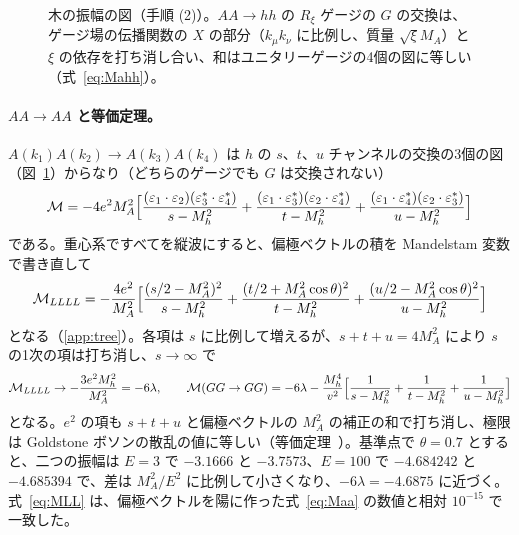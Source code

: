 \documentclass[a4paper,10pt]{ltjsarticle}
\newcommand{\tchan}[5]{%
  \draw[#1] (-1.0,0.72) -- (0,0.4); \draw[#2] (0,0.4) -- (1.0,0.72);
  \draw[#3] (0,0.4) -- (0,-0.4);
  \draw[#4] (-1.0,-0.72) -- (0,-0.4); \draw[#5] (0,-0.4) -- (1.0,-0.72);
  \node[vtx] at (0,0.4) {}; \node[vtx] at (0,-0.4) {};}
\newcommand{\uchan}[5]{%
  \draw[#1] (-1.0,0.72) -- (0,0.4); \draw[#2] (0,0.4) -- (1.0,-0.72);
  \draw[#3] (0,0.4) -- (0,-0.4);
  \draw[#4] (-1.0,-0.72) -- (0,-0.4); \draw[#5] (0,-0.4) -- (1.0,0.72);
  \node[vtx] at (0,0.4) {}; \node[vtx] at (0,-0.4) {};}
\begin{document}
\begin{figure}[tbp]
\caption{木の振幅の図（手順 (2)）。$AA\to hh$ の $R_\xi$ ゲージの $G$ の交換は、ゲージ場の伝播関数の $X$ の部分（$k_\mu k_\nu$ に比例し、質量 $\sqrt\xi M_A$）と $\xi$ の依存を打ち消し合い、和はユニタリーゲージの4個の図に等しい（式~\eqref{eq:Mahh}）。}
\label{fig:treediag}
\end{figure}

\paragraph{$AA\to AA$ と等価定理。}$A(k_1)A(k_2)\to A(k_3)A(k_4)$ は $h$ の $s$、$t$、$u$ チャンネルの交換の3個の図（図~\ref{fig:treediag}）からなり（どちらのゲージでも $G$ は交換されない）
\begin{equation}
\mathcal M=-4e^2M_A^2\Bigl[\frac{(\varepsilon_1\cdot\varepsilon_2)(\varepsilon_3^*\cdot\varepsilon_4^*)}{s-M_h^2}+\frac{(\varepsilon_1\cdot\varepsilon_3^*)(\varepsilon_2\cdot\varepsilon_4^*)}{t-M_h^2}+\frac{(\varepsilon_1\cdot\varepsilon_4^*)(\varepsilon_2\cdot\varepsilon_3^*)}{u-M_h^2}\Bigr]
\label{eq:Maa}
\end{equation}
である。重心系ですべてを縦波にすると、偏極ベクトルの積を Mandelstam 変数で書き直して
\begin{equation}
\mathcal M_{LLLL}=-\frac{4e^2}{M_A^2}\Bigl[\frac{(s/2-M_A^2)^2}{s-M_h^2}+\frac{(t/2+M_A^2\cos\theta)^2}{t-M_h^2}+\frac{(u/2-M_A^2\cos\theta)^2}{u-M_h^2}\Bigr]
\label{eq:MLL}
\end{equation}
となる（\ref{app:tree}）。各項は $s$ に比例して増えるが、$s+t+u=4M_A^2$ により $s$ の1次の項は打ち消し、$s\to\infty$ で
\begin{equation}
\mathcal M_{LLLL}\to-\frac{3e^2M_h^2}{M_A^2}=-6\lambda,\qquad
\mathcal M(GG\to GG)=-6\lambda-\frac{M_h^4}{v^2}\Bigl[\frac1{s-M_h^2}+\frac1{t-M_h^2}+\frac1{u-M_h^2}\Bigr]
\label{eq:et}
\end{equation}
となる。$e^2$ の項も $s+t+u$ と偏極ベクトルの $M_A^2$ の補正の和で打ち消し、極限は Goldstone ボソンの散乱の値に等しい（等価定理~\cite{clt74,lqt77}）。基準点で $\theta=0.7$ とすると、二つの振幅は $E=3$ で $-3.1666$ と $-3.7573$、$E=100$ で $-4.684242$ と $-4.685394$ で、差は $M_A^2/E^2$ に比例して小さくなり、$-6\lambda=-4.6875$ に近づく。式~\eqref{eq:MLL} は、偏極ベクトルを陽に作った式~\eqref{eq:Maa} の数値と相対 $10^{-15}$ で一致した。
\end{document}
